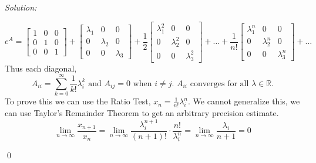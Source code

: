 \documentclass[11 pt]{article}
\newenvironment{sol}
    {\emph{Solution:}
    }
    {
    \qed
    }
\theoremstyle{definition}
\newcommand{\R}{\mathbb{R}} %
\begin{document}
\begin{sol}
\[e^A = \begin{bmatrix}
1 & 0 & 0\\
0 & 1 & 0\\
0 & 0 & 1
\end{bmatrix}
+
\begin{bmatrix}
\lambda_1 & 0 & 0\\
0 & \lambda_2 & 0\\
0 & 0 & \lambda_3
\end{bmatrix}
+
\frac{1}{2}
\begin{bmatrix}
\lambda_1^2 & 0 & 0\\
0 & \lambda_2^2 & 0\\
0 & 0 & \lambda_3^2
\end{bmatrix}+\dots+\frac{1}{n!}\begin{bmatrix}
\lambda_1^n & 0 & 0\\
0 & \lambda_2^n & 0\\
0 & 0 & \lambda_3^n
\end{bmatrix}+\dots\]
Thus each diagonal, \[A_{ii}=\sum_{k=0}^{\infty}\frac{1}{k!}\lambda_i^k\text{ and  }A_{ij}=0\text{ when }i\ne j\text{. $A_{ii}$ converges for all }\lambda\in\R.\]
To prove this we can use the Ratio Test, $x_n=\frac{1}{n!}\lambda_i^n$. We cannot generalize this, we can use Taylor's Remainder Theorem to get an arbitrary precision estimate.
\[\lim_{n\to\infty}\frac{x_{n+1}}{x_n}=\lim_{n\to\infty}\frac{\lambda_i^{n+1}}{(n+1)!}\cdot \frac{n!}{\lambda_i^n}=\lim_{n\to\infty}\frac{\lambda_i}{n+1}=0\]
\end{sol}

\pagebreak
\end{document}
